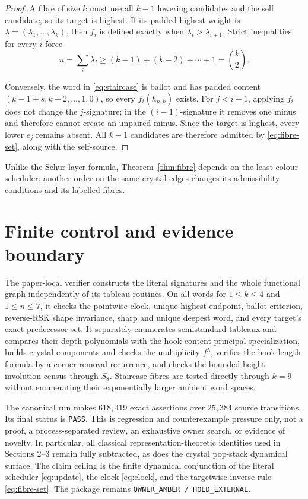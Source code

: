 \documentclass[a4paper,10pt]{amsart}
\theoremstyle{remark}
\begin{document}
\begin{proof}
A fibre of size $k$ must use all $k-1$ lowering candidates and the self
candidate, so its target is highest.  If its padded highest weight is
$\lambda=(\lambda_1,\ldots,\lambda_k)$, then $f_i$ is defined exactly when
$\lambda_i>\lambda_{i+1}$.  Strict inequalities for every $i$ force
\begin{equation*}
 n=\sum_i\lambda_i\geq(k-1)+(k-2)+\cdots+1=\binom{k}{2}.
\end{equation*}

Conversely, the word in \eqref{eq:staircase} is ballot and has padded
content $(k-1+s,k-2,\ldots,1,0)$, so every $f_i(h_{n,k})$ exists.  For
$j<i-1$, applying $f_i$ does not change the $j$-signature; in the
$(i-1)$-signature it removes one minus and therefore cannot create an
unpaired minus.  Since the target is highest, every lower $e_j$ remains
absent.  All $k-1$ candidates are therefore admitted by
\eqref{eq:fibre-set}, along with the self-source.
\end{proof}

Unlike the Schur layer formula, Theorem~\ref{thm:fibre} depends on the
least-colour scheduler: another order on the same crystal edges changes its
admissibility conditions and its labelled fibres.

\section{Finite control and evidence boundary}

The paper-local verifier constructs the literal signatures and the whole
functional graph independently of its tableau routines.  On all words for
$1\leq k\leq4$ and $1\leq n\leq7$, it checks the pointwise clock, unique
highest endpoint, ballot criterion, reverse-RSK shape invariance, sharp and
unique deepest word, and every target's exact predecessor set.  It separately
enumerates semistandard tableaux and compares their depth polynomials with
the hook-content principal specialization, builds crystal components and
checks the multiplicity $f^\lambda$, verifies the hook-length formula by a
corner-removal recurrence, and checks the bounded-height involution census
through $S_8$.  Staircase fibres are tested directly through $k=9$ without
enumerating their exponentially larger ambient word spaces.

The canonical run makes $618{,}419$ exact assertions over $25{,}384$ source
transitions.  Its final status is \texttt{PASS}.  This is regression and
counterexample pressure only, not a proof, a process-separated review, an
exhaustive owner search, or evidence of novelty.  In particular, all
classical representation-theoretic identities used in Sections 2--3 remain
fully subtracted, as does the crystal pop-stack dynamical surface.  The claim ceiling is the finite dynamical conjunction of
the literal scheduler \eqref{eq:update}, the clock \eqref{eq:clock}, and the
targetwise inverse rule \eqref{eq:fibre-set}.  The package remains
\texttt{OWNER\_AMBER / HOLD\_EXTERNAL}.



\end{document}
